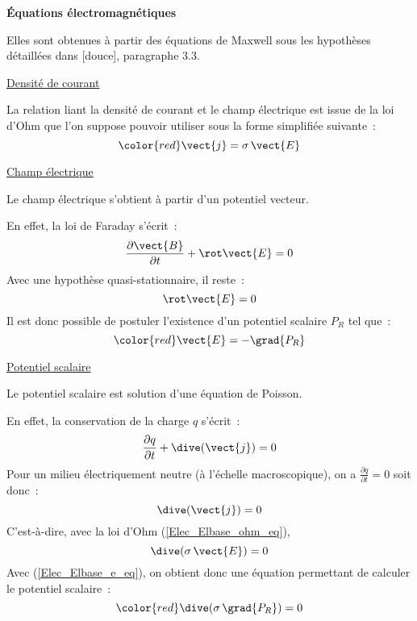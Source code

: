 \vspace*{0,5cm}
{\bf \'Equations \'electromagn\'etiques}
\nopagebreak

Elles sont obtenues \`a partir des
\'equations de Maxwell sous les hypoth\`eses d\'etaill\'ees dans [douce],
paragraphe 3.3.

\underline{Densit\'e de courant}
\nopagebreak

La relation liant la densit\'e de courant et le champ \'electrique est issue de
la loi d'Ohm que l'on suppose pouvoir utiliser sous la forme
simplifi\'ee suivante~:
\begin{equation}\label{Elec_Elbase_ohm_eq}
{\color{red}\vect{j}=\sigma\,\vect{E}}
\end{equation}

\underline{Champ \'electrique}
\nopagebreak

Le champ \'electrique s'obtient \`a partir d'un potentiel vecteur.

En effet, la loi de Faraday s'\'ecrit~:
\begin{equation}
\frac{\partial\vect{B}}{\partial t}+\rot\vect{E}=0
\end{equation}
Avec une hypoth\`ese quasi-stationnaire, il reste~:
\begin{equation}
\rot\vect{E}=0
\end{equation}
Il est donc possible de postuler l'existence d'un potentiel scalaire $P_R$
tel que~:
\begin{equation}\label{Elec_Elbase_e_eq}
{\color{red}\vect{E}=-\grad{P_R}}
\end{equation}

\underline{Potentiel scalaire}
\nopagebreak

Le potentiel scalaire est solution d'une \'equation de Poisson.

En effet, la conservation de la charge $q$ s'\'ecrit~:
\begin{equation}
\displaystyle\frac{\partial q}{\partial t}
+\dive(\vect{j}) = 0
\end{equation}
Pour un milieu \'electriquement neutre (\`a l'\'echelle macroscopique), on a
$\displaystyle\frac{\partial q}{\partial t}=0$ soit donc~:
\begin{equation}
\dive(\vect{j}) = 0
\end{equation}
C'est-\`a-dire, avec la loi d'Ohm (\ref{Elec_Elbase_ohm_eq}),
\begin{equation} \label{Elec_Elbase_div_sigma_e_eq}
\dive(\sigma\,\vect{E}) = 0
\end{equation}
Avec (\ref{Elec_Elbase_e_eq}), on obtient donc une \'equation permettant de
calculer le potentiel scalaire~:
\begin{equation}
{\color{red}\dive(\sigma\,\grad{P_R}) = 0}
\end{equation}

